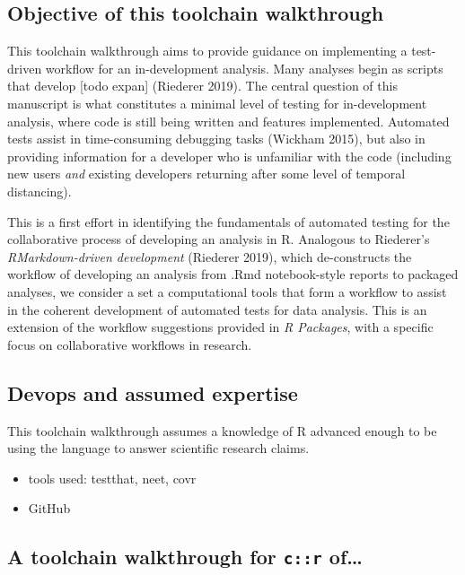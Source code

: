 \documentclass[
]{article}
\providecommand{\tightlist}{%
  \setlength{\itemsep}{0pt}\setlength{\parskip}{0pt}}
\begin{document}
\hypertarget{objective-of-this-toolchain-walkthrough}{%
\subsection{Objective of this toolchain
walkthrough}\label{objective-of-this-toolchain-walkthrough}}

This toolchain walkthrough aims to provide guidance on implementing a
test-driven workflow for an in-development analysis. Many analyses begin
as scripts that develop {[}todo expan{]} (Riederer 2019). The central
question of this manuscript is what constitutes a minimal level of
testing for in-development analysis, where code is still being written
and features implemented. Automated tests assist in time-consuming
debugging tasks (Wickham 2015), but also in providing information for a
developer who is unfamiliar with the code (including new users
\emph{and} existing developers returning after some level of temporal
distancing).

This is a first effort in identifying the fundamentals of automated
testing for the collaborative process of developing an analysis in R.
Analogous to Riederer's \emph{RMarkdown-driven development} (Riederer
2019), which de-constructs the workflow of developing an analysis from
.Rmd notebook-style reports to packaged analyses, we consider a set a
computational tools that form a workflow to assist in the coherent
development of automated tests for data analysis. This is an extension
of the workflow suggestions provided in \emph{R Packages}, with a
specific focus on collaborative workflows in research.

\hypertarget{devops-and-assumed-expertise}{%
\subsection{Devops and assumed
expertise}\label{devops-and-assumed-expertise}}

This toolchain walkthrough assumes a knowledge of R advanced enough to
be using the language to answer scientific research claims.

\begin{itemize}
\tightlist
\item
  tools used: testthat, neet, covr
\item
  GitHub
\end{itemize}

\hypertarget{a-toolchain-walkthrough-for-cr-of}{%
\subsection{\texorpdfstring{A toolchain walkthrough for \texttt{c::r}
of\ldots{}}{A toolchain walkthrough for c::r of\ldots{}}}\label{a-toolchain-walkthrough-for-cr-of}}
\end{document}
